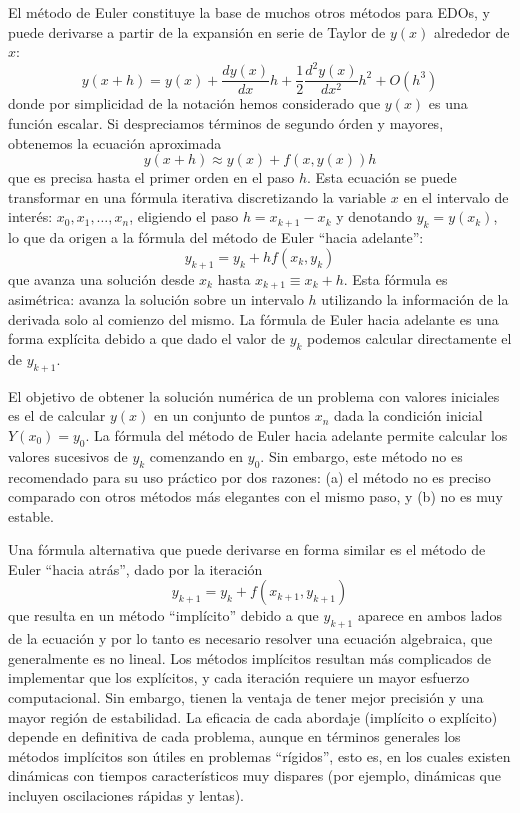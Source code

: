 El método de Euler constituye la base de muchos otros métodos para EDOs, y puede derivarse a partir de la expansión en serie de Taylor de $y(x)$ alrededor de $x$:
\begin{equation}\label{eq:taylor}
 y(x+h) = y(x) + \frac{dy(x)}{dx} h  + \frac{1}{2} \frac{d^2y(x)}{dx^2} h^2 + O(h^3)
\end{equation} 
donde por simplicidad de la notación hemos considerado que $y(x)$ es una función escalar. Si despreciamos términos de segundo órden y mayores, obtenemos la ecuación aproximada
\begin{equation}
 y(x+h) \approx y(x) + f(x, y(x)) h
\end{equation} 
que es precisa hasta el primer orden en el paso $h$. Esta ecuación se puede transformar en una fórmula iterativa discretizando la variable $x$ en el intervalo de interés: $x_0, x_1, \ldots, x_n$, eligiendo el paso $h = x_{k+1} -x_{k}$ y denotando $y_k = y(x_k)$, lo que da origen a la fórmula del método de Euler ``hacia adelante'':
 \begin{equation} \label{eq:euler}
  y_{k+1} = y_k + hf(x_k, y_k)
 \end{equation} 
que avanza una solución desde $x_k$ hasta $x_{k+1} \equiv x_k + h$. Esta fórmula es asimétrica: avanza la solución sobre un intervalo $h$ utilizando la información de la derivada solo al comienzo del mismo. La fórmula de Euler hacia adelante es una forma explícita debido a que dado el valor de $y_k$ podemos calcular directamente el de $y_{k+1}$. 
 
El objetivo de obtener la solución numérica de un problema con valores iniciales es el de calcular $y(x)$ en un conjunto de puntos $x_n$ dada la condición inicial $Y(x_0) = y_0$. La fórmula del método de Euler hacia adelante permite calcular los valores sucesivos de $y_k$ comenzando en $y_0$. Sin embargo, este método no es recomendado para su uso práctico por dos razones: (a) el método no es preciso comparado con otros métodos más elegantes con el mismo paso, y (b) no es muy estable.
 
 Una fórmula alternativa que puede derivarse en forma similar es el método de Euler ``hacia atrás'', dado por la iteración
 \begin{equation}
  y_{k+1} = y_k + f(x_{k+1}, y_{k+1})
 \end{equation} 
que resulta en un método ``implícito'' debido a que $y_{k+1}$ aparece en ambos lados de la ecuación y por lo tanto es necesario resolver una ecuación algebraica, que generalmente es no lineal. Los métodos implícitos resultan más complicados de implementar que los explícitos, y cada iteración requiere un mayor esfuerzo computacional. Sin embargo, tienen la ventaja de tener mejor precisión y una mayor región de estabilidad. La eficacia de cada abordaje (implícito o explícito) depende en definitiva de cada problema, aunque en términos generales los métodos implícitos son útiles en problemas ``rígidos'', esto es, en los cuales existen dinámicas con tiempos característicos muy dispares (por ejemplo, dinámicas que incluyen oscilaciones rápidas y lentas).
 

